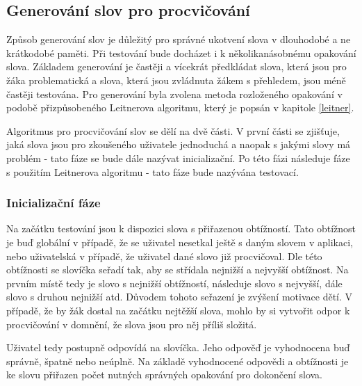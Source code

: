 \documentclass[a4paper,11pt,titlepage,fleqn]{article}
\begin{document}
    \subsection{Generování slov pro procvičování}
        Způsob generování slov je důležitý pro správné ukotvení slova v dlouhodobé a ne krátkodobé paměti. Při testování bude docházet i k několikanásobnému opakování slova. Základem generování je častěji a vícekrát předkládat slova, která jsou pro žáka problematická a slova, která jsou zvládnuta žákem s přehledem, jsou méně častěji testována. Pro generování byla zvolena metoda rozloženého opakování v podobě přizpůsobeného Leitnerova algoritmu, který je popsán v kapitole \ref{leitner}.
        
        Algoritmus pro procvičování slov se dělí na dvě části. V první části se zjišťuje, jaká slova jsou pro zkoušeného uživatele jednoduchá a naopak s jakými slovy má problém - tato fáze se bude dále nazývat inicializační. Po této fázi následuje fáze s použitím Leitnerova algoritmu - tato fáze bude nazývána testovací.

        \subsubsection{Inicializační fáze}
            \label{init-faze}
            Na začátku testování jsou k dispozici slova s přiřazenou obtížností. Tato obtížnost je buď globální v případě, že se uživatel nesetkal ještě s daným slovem v aplikaci, nebo uživatelská v případě, že uživatel dané slovo již procvičoval. Dle této obtížnosti se slovíčka seřadí tak, aby se střídala nejnižší a nejvyšší obtížnost. Na prvním místě tedy je slovo s nejnižší obtížností, následuje slovo s nejvyšší, dále slovo s druhou nejnižší atd. Důvodem tohoto seřazení je zvýšení motivace dětí. V případě, že by žák dostal na začátku nejtěžší slova, mohlo by si vytvořit odpor k procvičování v domnění, že slova jsou pro něj příliš složitá. 

            Uživatel tedy postupně odpovídá na slovíčka. Jeho odpověď je vyhodnocena buď správně, špatně nebo neúplně. Na základě vyhodnocené odpovědi a obtížnosti je ke slovu přiřazen počet nutných správných opakování pro dokončení slova.
\end{document}

